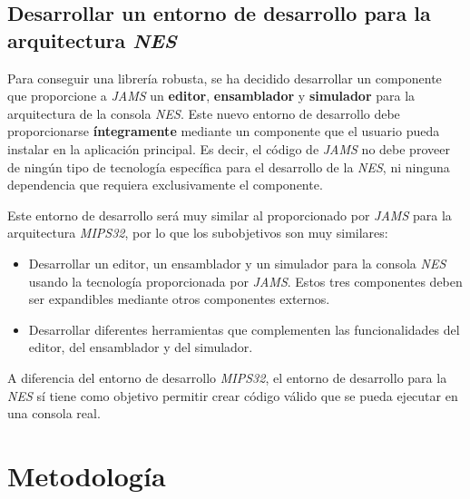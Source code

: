\subsection{Desarrollar un entorno de desarrollo para la arquitectura \textit{NES}}
\label{subsec:desarrollar-un-entorno-de-desarrollo-para-la-arquitectura-mips32}

Para conseguir una librería robusta, se ha decidido desarrollar un componente
que proporcione a \textit{JAMS} un \textbf{editor}, 
\textbf{ensamblador} y  \textbf{simulador}
para la arquitectura de la consola \textit{NES}.
Este nuevo entorno de desarrollo debe proporcionarse \textbf{íntegramente}
mediante un componente que el usuario pueda instalar en la aplicación
principal.
Es decir, el código de \textit{JAMS} no debe proveer de ningún
tipo de tecnología específica para el desarrollo de la \textit{NES},
ni ninguna dependencia que requiera exclusivamente el componente.

Este entorno de desarrollo será muy similar al proporcionado
por \textit{JAMS} para la arquitectura \textit{MIPS32},  por lo que los
subobjetivos son muy similares:

\begin{itemize}
    \item Desarrollar un editor, un ensamblador y un simulador
    para la consola \textit{NES} usando la tecnología
    proporcionada por \textit{JAMS}.
    Estos tres componentes deben ser expandibles mediante otros componentes externos.
    \item Desarrollar diferentes herramientas que complementen las funcionalidades
    del editor, del ensamblador y del simulador.
\end{itemize}

A diferencia del entorno de desarrollo \textit{MIPS32},  el entorno
de desarrollo para la \textit{NES} sí tiene como objetivo permitir crear
código válido que se pueda ejecutar en una consola real.


\section{Metodología}\label{sec:metodologia}

